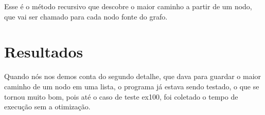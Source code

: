 \documentclass[12pt]{article}
\begin{document}
Esse é o método recursivo que descobre o maior caminho a partir de um nodo, que vai ser chamado para cada nodo fonte do grafo.

\section{Resultados}

Quando nós nos demos conta do segundo detalhe, que dava para guardar o maior caminho de um nodo em uma lista, o programa já estava sendo testado, o que se tornou muito bom, pois até o caso de teste ex100, foi coletado o tempo de execução sem a otimização.

\begin{table}[H]

\centering

\begin{tabular}{|c|c|c|c|c|c|}


\end{tabular}
\end{table}
\end{document}
